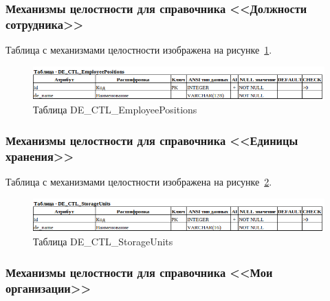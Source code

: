 \subsubsection{Механизмы целостности для справочника <<Должности сотрудника>>}

Таблица с механизмами целостности изображена на рисунке~\ref{fig:Logic_DE_CTL_EmployeePositions}.

\begin{figure}[!h]
    \centering

    \includegraphics[width=18cm]
    {assets/database/Types/DE_CTL_EmployeePositions.png}

    \caption{Таблица DE\_CTL\_EmployeePositions}

    \label{fig:Logic_DE_CTL_EmployeePositions}
\end{figure}


\subsubsection{Механизмы целостности для справочника <<Единицы хранения>>}

Таблица с механизмами целостности изображена на рисунке~\ref{fig:Logic_DE_CTL_StorageUnits}.

\begin{figure}[!h]
    \centering

    \includegraphics[width=18cm]
    {assets/database/Types/DE_CTL_StorageUnits.png}

    \caption{Таблица DE\_CTL\_StorageUnits}

    \label{fig:Logic_DE_CTL_StorageUnits}
\end{figure}


\subsubsection{Механизмы целостности для справочника <<Мои организации>>}

